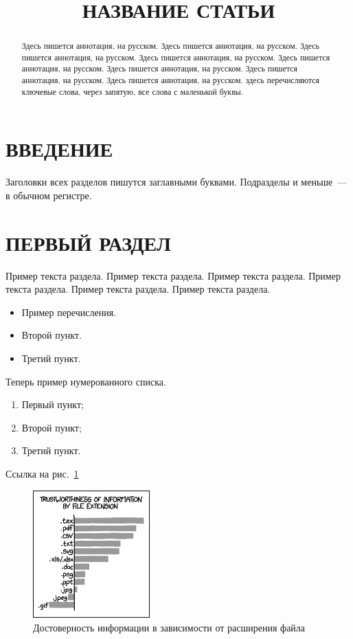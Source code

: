 \documentclass[intlimits,twoside,a4paper,11pt]{article}
\title[Название статьи]{НАЗВАНИЕ СТАТЬИ}
\begin{document}
\maketitle

\begin{abstract}
Здесь пишется аннотация, на русском.
Здесь пишется аннотация, на русском.
Здесь пишется аннотация, на русском.
Здесь пишется аннотация, на русском.
Здесь пишется аннотация, на русском.
Здесь пишется аннотация, на русском.
Здесь пишется аннотация, на русском.
Здесь пишется аннотация, на русском.
\keywords здесь перечисляются ключевые слова, через запятую, все слова с маленькой буквы.
\end{abstract}

\section{ВВЕДЕНИЕ}
Заголовки всех разделов пишутся заглавными буквами. Подразделы и меньше~--- в обычном регистре.

\section{ПЕРВЫЙ РАЗДЕЛ}
Пример текста раздела. Пример текста раздела. Пример текста раздела. Пример текста раздела. Пример текста раздела. Пример текста раздела.
\begin{itemize}
\item Пример перечисления.
\item Второй пункт.
\item Третий пункт.
\end{itemize}

Теперь пример нумерованного списка.
\begin{enumerate}
\item Первый пункт;
\item Второй пункт;
\item Третий пункт.
\end{enumerate}
Ссылка на рис.~\ref{fig-example}

\begin{figure}[htb]
\centering
\includegraphics[width=0.4\textwidth]{xkcd1301.png}
\caption{Достоверность информации в зависимости от расширения файла} \label{fig-example}
\end{figure}
\end{document}
